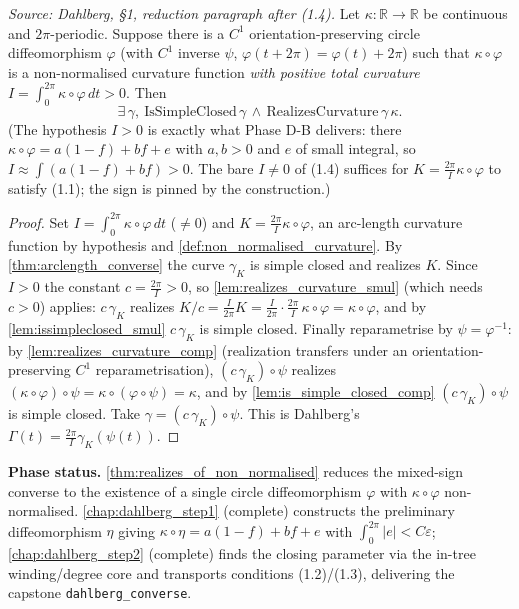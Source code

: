 \begin{theorem}


  \label{thm:realizes_of_non_normalised}
  \textit{Source: Dahlberg, §1, reduction paragraph after (1.4).}
  Let $\kappa : \mathbb{R}\to\mathbb{R}$ be continuous and $2\pi$-periodic. Suppose
  there is a $C^1$ orientation-preserving circle diffeomorphism $\varphi$ (with
  $C^1$ inverse $\psi$, $\varphi(t+2\pi)=\varphi(t)+2\pi$) such that
  $\kappa\circ\varphi$ is a non-normalised curvature function \emph{with positive
  total curvature} $I=\int_0^{2\pi}\kappa\circ\varphi\,dt>0$. Then
  \[
    \exists\,\gamma,\ \mathrm{IsSimpleClosed}\,\gamma \,\wedge\,
       \mathrm{RealizesCurvature}\,\gamma\,\kappa.
  \]
  (The hypothesis $I>0$ is exactly what Phase D-B delivers: there
  $\kappa\circ\varphi=a(1-f)+bf+e$ with $a,b>0$ and $e$ of small integral, so
  $I\approx\int(a(1-f)+bf)>0$. The bare $I\neq 0$ of (1.4) suffices for
  $K=\frac{2\pi}{I}\kappa\circ\varphi$ to satisfy (1.1); the sign is pinned by the
  construction.)
\end{theorem}
\begin{proof}
  \leanok
  Set $I=\int_0^{2\pi}\kappa\circ\varphi\,dt$ ($\neq 0$) and $K=\frac{2\pi}{I}
  \kappa\circ\varphi$, an arc-length curvature function by hypothesis and
  \cref{def:non_normalised_curvature}. By \cref{thm:arclength_converse} the curve
  $\gamma_K$ is simple closed and realizes $K$. Since $I>0$ the constant
  $c=\tfrac{2\pi}{I}>0$, so \cref{lem:realizes_curvature_smul} (which needs $c>0$)
  applies: $c\,\gamma_K$ realizes
  $K/c=\tfrac{I}{2\pi}K=\tfrac{I}{2\pi}\cdot\tfrac{2\pi}{I}\,\kappa\circ\varphi
  =\kappa\circ\varphi$, and by
  \cref{lem:issimpleclosed_smul} $c\,\gamma_K$ is simple closed. Finally
  reparametrise by $\psi=\varphi^{-1}$: by
  \cref{lem:realizes_curvature_comp} (realization transfers under an
  orientation-preserving $C^1$ reparametrisation), $(c\,\gamma_K)\circ\psi$
  realizes $(\kappa\circ\varphi)\circ\psi=\kappa\circ(\varphi\circ\psi)=\kappa$,
  and by \cref{lem:is_simple_closed_comp} $(c\,\gamma_K)\circ\psi$ is simple
  closed. Take $\gamma=(c\,\gamma_K)\circ\psi$. This is Dahlberg's
  $\Gamma(t)=\frac{2\pi}{I}\gamma_K(\psi(t))$.
\end{proof}

\noindent\textbf{Phase status.} \cref{thm:realizes_of_non_normalised} reduces the
mixed-sign converse to the existence of a single circle diffeomorphism $\varphi$
with $\kappa\circ\varphi$ non-normalised. \cref{chap:dahlberg_step1} (complete)
constructs the preliminary diffeomorphism $\eta$ giving $\kappa\circ\eta=a(1-f)+bf
+e$ with $\int_0^{2\pi}|e|<C\varepsilon$; \cref{chap:dahlberg_step2} (complete)
finds the closing parameter via the in-tree winding/degree core and transports
conditions (1.2)/(1.3), delivering the capstone \texttt{dahlberg\_converse}.
